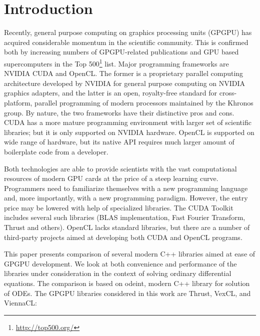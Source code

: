 \documentclass[1p]{elsarticle}
\begin{document}
%
%
\section{Introduction}

Recently, general purpose computing on graphics processing units (GPGPU)
 has acquired considerable momentum in the
scientific community. This is confirmed both by increasing numbers of
GPGPU-related publications and GPU based supercomputers in
the Top 500\footnote{\href{http://top500.org/}{http://top500.org/}} list. Major
programming frameworks are NVIDIA CUDA and OpenCL.  The former is a proprietary
parallel computing architecture developed by NVIDIA for general purpose
computing on NVIDIA graphics adapters, and the latter is an open, royalty-free
standard for cross-platform, parallel programming of modern processors maintained
by the Khronos group. By nature, the two frameworks have their distinctive pros and cons. CUDA has
a more mature programming environment with larger set of scientific libraries;
but it is only supported on NVIDIA hardware. OpenCL is
supported on wide range of hardware, but its native API requires much larger
amount of boilerplate code from a developer.

Both technologies are able to provide scientists with the vast computational
resources of modern GPU cards at the price of a steep learning curve.
Programmers need to familiarize
themselves with a new programming language and, more importantly, with a
new programming paradigm. However, the entry price may be lowered with help of
specialized libraries. The CUDA Toolkit includes several such libraries (BLAS
implementation, Fast Fourier Transform, Thrust and others). OpenCL lacks
standard libraries, but there are a number of third-party projects aimed at
developing both CUDA and OpenCL programs.

This paper presents comparison of several modern C++ libraries aimed at ease of
GPGPU development. We look at both convenience and performance of the libraries
under consideration in the context of solving ordinary differential equations.
The comparison is based on odeint, modern C++ library for solution of ODEs.
The GPGPU libraries considered in this work are Thrust, VexCL, and ViennaCL:

\end{document}
